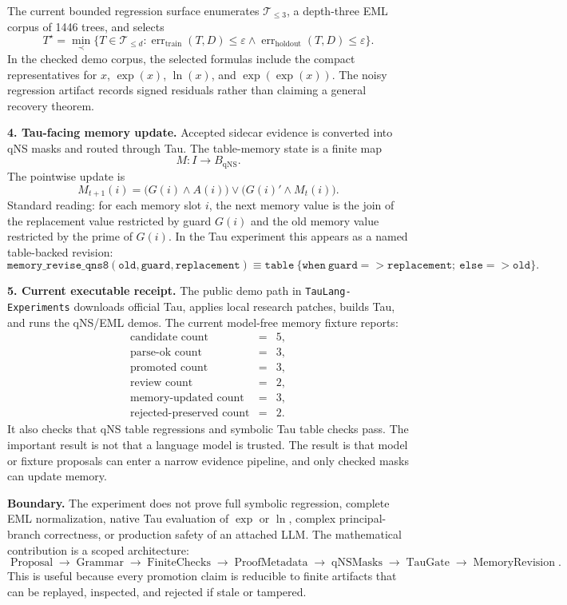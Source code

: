 \documentclass[10pt]{article}
\begin{document}
The current bounded regression surface enumerates \(\mathcal{T}_{\le 3}\), a
depth-three EML corpus of 1446 trees, and selects
\[
T^\star
=
\min_{\prec}
\{T\in\mathcal{T}_{\le d}:
\operatorname{err}_{\mathrm{train}}(T,D)\le\varepsilon
\wedge
\operatorname{err}_{\mathrm{holdout}}(T,D)\le\varepsilon\}.
\]
In the checked demo corpus, the selected formulas include the compact
representatives for \(x\), \(\exp(x)\), \(\ln(x)\), and \(\exp(\exp(x))\).
The noisy regression artifact records signed residuals rather than claiming a
general recovery theorem.

\textbf{4. Tau-facing memory update.}
Accepted sidecar evidence is converted into qNS masks and routed through Tau.
The table-memory state is a finite map
\[
M:I\to B_{\mathrm{qNS}}.
\]
The pointwise update is
\[
M_{t+1}(i)
=
\bigl(G(i)\wedge A(i)\bigr)
\vee
\bigl(G(i)'\wedge M_t(i)\bigr).
\]
Standard reading: for each memory slot \(i\), the next memory value is the join
of the replacement value restricted by guard \(G(i)\) and the old memory value
restricted by the prime of \(G(i)\). In the Tau experiment this appears as a
named table-backed revision:
\[
\mathtt{memory\_revise\_qns8(old,guard,replacement)}
\equiv
\mathtt{table\ \{when\ guard => replacement;\ else => old\}}.
\]

\textbf{5. Current executable receipt.}
The public demo path in \texttt{TauLang-Experiments} downloads official Tau,
applies local research patches, builds Tau, and runs the qNS/EML demos. The
current model-free memory fixture reports:
\[
\begin{array}{rcl}
\text{candidate count} &=& 5,\\
\text{parse-ok count} &=& 3,\\
\text{promoted count} &=& 3,\\
\text{review count} &=& 2,\\
\text{memory-updated count} &=& 3,\\
\text{rejected-preserved count} &=& 2.
\end{array}
\]
It also checks that qNS table regressions and symbolic Tau table checks pass.
The important result is not that a language model is trusted. The result is
that model or fixture proposals can enter a narrow evidence pipeline, and only
checked masks can update memory.

\textbf{Boundary.}
The experiment does not prove full symbolic regression, complete EML
normalization, native Tau evaluation of \(\exp\) or \(\ln\), complex
principal-branch correctness, or production safety of an attached LLM. The
mathematical contribution is a scoped architecture:
\[
\operatorname{Proposal}
\to
\operatorname{Grammar}
\to
\operatorname{FiniteChecks}
\to
\operatorname{ProofMetadata}
\to
\operatorname{qNSMasks}
\to
\operatorname{TauGate}
\to
\operatorname{MemoryRevision}.
\]
This is useful because every promotion claim is reducible to finite artifacts
that can be replayed, inspected, and rejected if stale or tampered.
\end{document}
